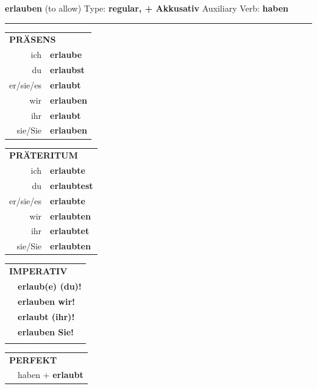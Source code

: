 \documentclass[10pt,a4paper]{revtex4-2}
\begin{document}
\begin{verbbox-acc}
    {\Large \bf erlauben} (to allow) \hfill Type: \textbf{regular, + Akkusativ} \hfill Auxiliary Verb: \textbf{haben} 
    
     \vspace{5pt}

    \hrule
    
    \vspace{5pt}

  \begin{tabular}{rl}
     \multicolumn{2}{l}{\textbf{PRÄSENS} }\\
    ich & \textbf{erlaube}\\
    du & \textbf{erlaubst}\\
    er/sie/es & \textbf{erlaubt}\\
    wir & \textbf{erlauben}\\
    ihr & \textbf{erlaubt}\\
    sie/Sie & \textbf{erlauben}\\
  \end{tabular}
  \hfill
     \begin{tabular}{rl}
    \multicolumn{2}{l}{\textbf{PRÄTERITUM} }\\
    ich & \textbf{erlaubte}\\
    du & \textbf{erlaubtest}\\
    er/sie/es & \textbf{erlaubte}\\
    wir & \textbf{erlaubten}\\
    ihr & \textbf{erlaubtet}\\
    sie/Sie & \textbf{erlaubten}\\
  \end{tabular}
  \hfill
  \begin{tabular}{rl}
     \multicolumn{2}{l}{\textbf{IMPERATIV} }\\
   & \textbf{erlaub(e) (du)!}\\
   & \textbf{erlauben wir!}\\
   & \textbf{erlaubt (ihr)!}\\
   & \textbf{erlauben Sie!}\\
   & \vspace{10pt}
  \end{tabular}

    \vspace{10pt}

 \begin{tabular}{rl}
     \multicolumn{2}{l}{\textbf{PERFEKT}}\\
   & haben + \textbf{erlaubt}\\
  \end{tabular}
\hfill
   \begin{tabular}{rl}
   

\end{tabular}
\end{verbbox-acc}
\end{document}
